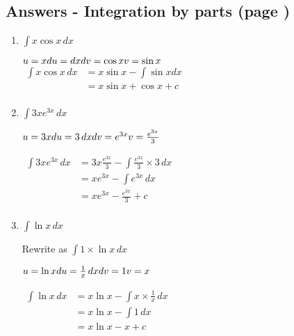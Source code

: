 \documentclass[../main.tex]{subfiles}
\begin{document}
\subsection*{Answers - Integration by parts (page \pageref{Integration by parts})}


\begin{enumerate}
    \item \(\int x\cos{x} \, dx\)
    
    \(u=x\\
    du=dx\\
    dv=\cos{x}\\
    v=\sin{x}\)\\
    $
    \!
    \begin{aligned}
        \int x\cos{x} \, dx 
        &= x\sin{x}-\int \sin{x} dx\\
        &=x\sin{x}+\cos{x}+c\\
    \end{aligned}
    $

    \item \(\int 3xe^{3x}\, dx\)
    
    \(u=3x\\
    du=3\,dx\\
    dv=e^{3x}\\
    v=\frac{e^{3x}}{3}\)

    $
    \!
    \begin{aligned}
        \int 3xe^{3x}\, dx 
        &=3x\frac{e^{3x}}{3}-\int \frac{e^{3x}}{3}\times 3 \,dx\\
        &=xe^{3x}-\int e^{3x}\, dx\\
        &=xe^{3x}-\frac{e^{3x}}{3}+c\\
    \end{aligned}
    $

    \item \(\int \ln{x}\, dx\)
    
    Rewrite as \(\int 1\times \ln{x}\, dx\)

    \(u=\ln{x}\\
    du=\frac{1}{x}\,dx\\
    dv=1\\
    v=x\)

    $
    \!
    \begin{aligned}
        \int \ln{x}\, dx
        &=x\ln{x}-\int x\times \frac{1}{x}\, dx\\
        &=x\ln{x}-\int 1\, dx\\
        &=x\ln{x}-x+c\\
    \end{aligned}
    $


\end{enumerate}
\end{document}

